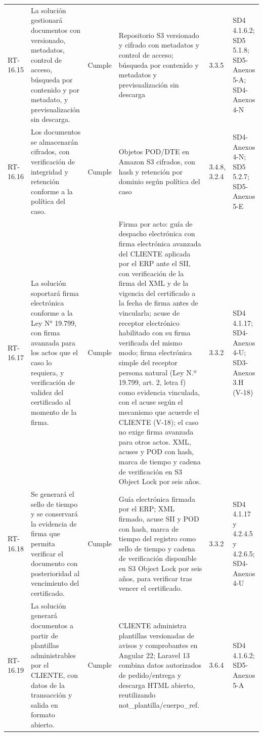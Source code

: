 \documentclass[carta,firma,final]{lafrox}
\begin{document}
\begin{landscape}
{\begin{longtable}{@{}F{0.070} F{0.255} F{0.075} F{0.280} F{0.090} F{0.230}@{}}
  RT-16.15 & La solución gestionará documentos con versionado, metadatos, control de acceso, búsqueda por contenido y por metadato, y previsualización sin descarga. & Cumple & Repositorio S3 versionado y cifrado con metadatos y control de acceso; búsqueda por contenido y metadatos y previsualización sin descarga & 3.3.5 & SD4 4.1.6.2; SD5 5.1.8; SD5-Anexos 5-A; SD4-Anexos 4-N \\
  RT-16.16 & Los documentos se almacenarán cifrados, con verificación de integridad y retención conforme a la política del caso. & Cumple & Objetos POD/DTE en Amazon S3 cifrados, con hash y retención por dominio según política del caso & 3.4.8, 3.2.4 & SD4-Anexos 4-N; SD5 5.2.7; SD5-Anexos 5-E \\
  RT-16.17 & La solución soportará firma electrónica conforme a la Ley N° 19.799, con firma avanzada para los actos que el caso lo requiera, y verificación de validez del certificado al momento de la firma. & Cumple & Firma por acto: guía de despacho electrónica con firma electrónica avanzada del CLIENTE aplicada por el ERP ante el SII, con verificación de la firma del XML y de la vigencia del certificado a la fecha de firma antes de vincularla; acuse de receptor electrónico habilitado con su firma verificada del mismo modo; firma electrónica simple del receptor persona natural (Ley N.º 19.799, art. 2, letra f) como evidencia vinculada, con el acuse según el mecanismo que acuerde el CLIENTE (V-18); el caso no exige firma avanzada para otros actos. XML, acuses y POD con hash, marca de tiempo y cadena de verificación en S3 Object Lock por seis años. & 3.3.2 & SD4 4.1.17; SD4-Anexos 4-U; SD3-Anexos 3.H (V-18) \\
  RT-16.18 & Se generará el sello de tiempo y se conservará la evidencia de firma que permita verificar el documento con posterioridad al vencimiento del certificado. & Cumple & Guía electrónica firmada por el ERP; XML firmado, acuse SII y POD con hash, marca de tiempo del registro como sello de tiempo y cadena de verificación disponible en S3 Object Lock por seis años, para verificar tras vencer el certificado. & 3.3.2 & SD4 4.1.17 y 4.2.4.5 y 4.2.6.5; SD4-Anexos 4-U \\
  RT-16.19 & La solución generará documentos a partir de plantillas administrables por el CLIENTE, con datos de la transacción y salida en formato abierto. & Cumple & CLIENTE administra plantillas versionadas de avisos y comprobantes en Angular 22; Laravel 13 combina datos autorizados de pedido/entrega y descarga HTML abierto, reutilizando not\_plantilla/cuerpo\_ref. & 3.6.4 & SD4 4.1.6.2; SD5-Anexos 5-A \\

\end{longtable}}
\end{landscape}
\end{document}
